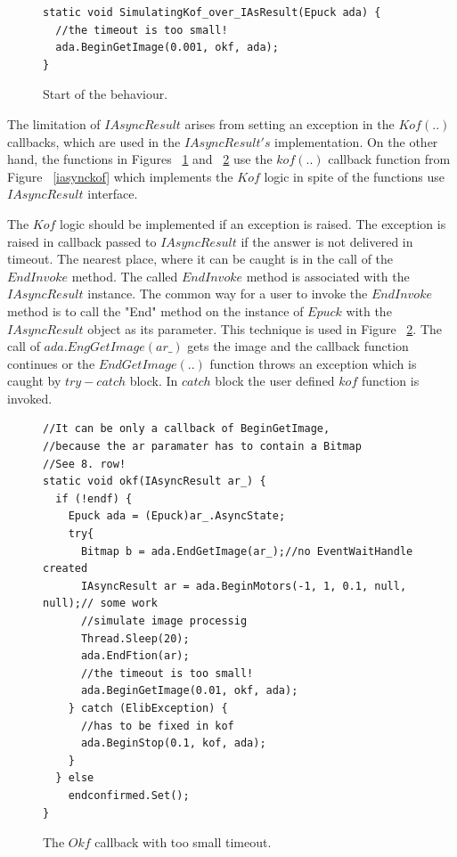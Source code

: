 \begin{figure}[!hbp]
\begin{lstlisting}
static void SimulatingKof_over_IAsResult(Epuck ada) {
  //the timeout is too small!
  ada.BeginGetImage(0.001, okf, ada);
}
\end{lstlisting}
\caption{Start of the behaviour.}
\label{c:start}
\end{figure}

  The limitation of $IAsyncResult$ arises from setting an exception in the $Kof(..)$ callbacks,
  which are used in the $IAsyncResult's$ implementation.
  On the other hand, the functions in Figures ~\ref{c:start} and ~\ref{c:okfsim} use the $kof(..)$ callback function
  from Figure ~\ref{iasynckof} 
  which implements the $Kof$ logic in spite of the functions use $IAsyncResult$ interface.

  The $Kof$ logic should be implemented if an exception is raised. 
  The exception is raised in callback passed to $IAsyncResult$ if the answer is not delivered in timeout. 
  The nearest place, where it can be caught is in the call of the $EndInvoke$ method.
  The called $EndInvoke$ method is associated with the $IAsyncResult$ instance. 
  The common way for a user to invoke the $EndInvoke$ method is to call the "End" method 
  on the instance of $Epuck$ with the $IAsyncResult$ object as its parameter. 
  This technique is used in Figure ~\ref{c:okfsim}.
  The call of $ada.EngGetImage(ar\_)$ gets the image and the callback function continues
  or the $EndGetImage(..)$ function throws an exception which is caught by $try-catch$ block.
  In $catch$ block the user defined $kof$ function is invoked.
  
\begin{figure}[!hbp]
\begin{lstlisting}
//It can be only a callback of BeginGetImage,
//because the ar paramater has to contain a Bitmap
//See 8. row!
static void okf(IAsyncResult ar_) {
  if (!endf) {
    Epuck ada = (Epuck)ar_.AsyncState;
    try{
      Bitmap b = ada.EndGetImage(ar_);//no EventWaitHandle created
      IAsyncResult ar = ada.BeginMotors(-1, 1, 0.1, null, null);// some work
      //simulate image processig
      Thread.Sleep(20);
      ada.EndFtion(ar);
      //the timeout is too small!
      ada.BeginGetImage(0.01, okf, ada);
    } catch (ElibException) {
      //has to be fixed in kof
      ada.BeginStop(0.1, kof, ada);
    }
  } else
    endconfirmed.Set();
}
\end{lstlisting}
\caption{The $Okf$ callback with too small timeout.}
\label{c:okfsim}
\end{figure}

